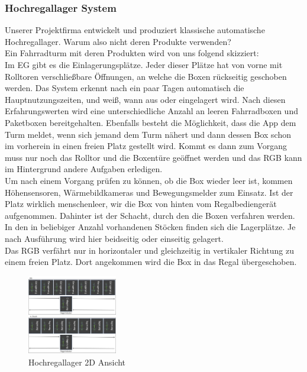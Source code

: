 \subsubsection{Hochregallager System}
Unserer Projektfirma entwickelt und produziert klassische automatische Hochregallager. Warum also nicht deren Produkte verwenden? \\
Ein Fahrradturm mit deren Produkten wird von uns folgend skizziert:\\
Im EG gibt es die Einlagerungsplätze. Jeder dieser Plätze hat von vorne mit Rolltoren verschließbare Öffnungen, an welche die Boxen rückseitig geschoben werden. Das System erkennt nach ein paar Tagen automatisch die Hauptnutzungszeiten, und weiß, wann aus oder eingelagert wird. Nach diesen Erfahrungswerten wird eine unterschiedliche Anzahl an leeren Fahrradboxen und Paketboxen bereitgehalten. Ebenfalls besteht die Möglichkeit, dass die App dem Turm meldet, wenn sich jemand dem Turm nähert und dann dessen Box schon im vorherein in einen freien Platz gestellt wird. Kommt es dann zum Vorgang muss nur noch das Rolltor und die Boxentüre geöffnet werden und das RGB kann im Hintergrund andere Aufgaben erledigen.\\
Um nach einem Vorgang prüfen zu können, ob die Box wieder leer ist, kommen Höhensensoren, Wärmebildkameras und Bewegungsmelder zum Einsatz. Ist der Platz wirklich menschenleer, wir die Box von hinten vom Regalbediengerät aufgenommen. Dahinter ist der Schacht, durch den die Boxen verfahren werden. In den in beliebiger Anzahl vorhandenen Stöcken finden sich die Lagerplätze. Je nach Ausführung wird hier beidseitig oder einseitig gelagert.\\
Das RGB verfährt nur in horizontaler und gleichzeitig in vertikaler Richtung zu einem freien Platz. Dort angekommen wird die Box in das Regal übergeschoben.\\
\begin{figure}[H]
    \centering
    \includegraphics[width=0.35\textwidth]{images/hochregallager2d.jpg}
    \caption{Hochregallager 2D Ansicht}
    \label{fig:hochregallager2d}
\end{figure}
